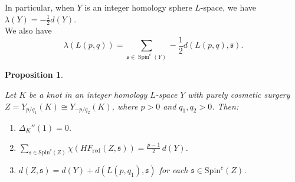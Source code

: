 \documentclass[12pt]{amsart}
\newtheorem{proposition}[theorem]{Proposition}
\theoremstyle{definition}
\theoremstyle{definition}
\newcommand{\Spin}{\text{Spin}}
\newcommand{\HF}{HF}
\newcommand{\din}{d}
\begin{document}
In particular, when $Y$ is an integer homology sphere $L$-space, we have  $\lambda(Y)= -\frac{1}{2} \din(Y)$.\\

We also have \[\lambda(L(p,q))= \sum_{\mathfrak{s} \in \operatorname{Spin}^c(Y)}- \frac{1}{2}  \din (L(p,q), \mathfrak{s}). \]


\begin{proposition}\label{cosmeticconstraint}
    
Let $K$ be a knot in an integer homology $L$-space $Y$ with purely
cosmetic surgery $Z = Y_{p/q_1}(K) \cong Y_{-p/q_2}(K)$,
where $p > 0$ and $q_1, q_2 > 0$.  Then:
\begin{enumerate}
\item $\Delta_K''(1) = 0$.
\item $\displaystyle\sum_{\mathfrak{s} \in \Spin^c(Z)}
\chi(\HF_{\mathrm{red}}(Z,\mathfrak{s})) = \frac{p-1}{2}\,\din(Y)$.
\item $\din(Z,\mathfrak{s}) = \din(Y) + \din(L(p,q_1),\mathfrak{s})$
for each $\mathfrak{s} \in \Spin^c(Z)$.
\end{enumerate}

\end{proposition}
\end{document}
